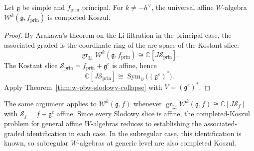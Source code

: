 \begin{corollary}
\label{cor:w-principal-completed-koszul}
Let $\mathfrak{g}$ be simple and $f_{\mathrm{prin}}$ principal.  For
$k \neq -h^\vee$, the universal affine $W$-algebra
$\mathcal{W}^k(\mathfrak{g}, f_{\mathrm{prin}})$ is completed
Koszul.
\end{corollary}

\begin{proof}
By Arakawa's theorem on the Li filtration in the principal case, the
associated graded is the coordinate ring of the arc space of the
Kostant slice:
\[
\operatorname{gr}_{\mathrm{Li}}
  \mathcal{W}^k(\mathfrak{g}, f_{\mathrm{prin}})
\cong \mathbb{C}[J\mathcal{S}_{\mathrm{prin}}].
\]
The Kostant slice $\mathcal{S}_{\mathrm{prin}}
= f_{\mathrm{prin}} + \mathfrak{g}^e$ is affine, hence
\[
\mathbb{C}[J\mathcal{S}_{\mathrm{prin}}]
\cong \operatorname{Sym}_\partial\bigl((\mathfrak{g}^e)^*\bigr).
\]
Apply Theorem~\ref{thm:w-pbw-slodowy-collapse} with
$V = (\mathfrak{g}^e)^*$.
\end{proof}

\begin{remark}
\label{rem:w-arbitrary-nilpotent-completed-koszul}
The same argument applies to
$\mathcal{W}^k(\mathfrak{g}, f)$ whenever
$\operatorname{gr}_{\mathrm{Li}} \mathcal{W}^k(\mathfrak{g}, f)
\cong \mathbb{C}[J\mathcal{S}_f]$
with $\mathcal{S}_f = f + \mathfrak{g}^e$ affine.  Since every
Slodowy slice is affine, the completed-Koszul problem for general
affine $W$-algebras reduces to establishing the associated-graded
identification in each case.  In the subregular case, this
identification is known, so subregular $W$-algebras at generic level
are also completed Koszul.
\end{remark}

